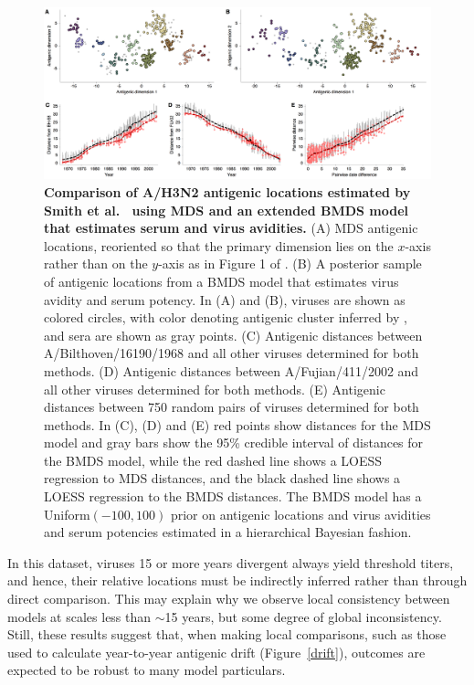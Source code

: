 \documentclass[11pt,oneside,letterpaper]{article}
\begin{document}
\begin{figure}[h]
	\centering		
	\includegraphics[width=1.0\textwidth]{figures/smith_comparison_effects}
	\caption{\textbf{Comparison of A/H3N2 antigenic locations estimated by Smith et al.\ \cite{Smith04} using MDS and an extended BMDS model that estimates serum and virus avidities.} 
	(A) MDS antigenic locations, reoriented so that the primary dimension lies on the $x$-axis rather than on the $y$-axis as in Figure 1 of \cite{Smith04}.
	(B) A posterior sample of antigenic locations from a BMDS model that estimates virus avidity and serum potency.
	In (A) and (B), viruses are shown as colored circles, with color denoting antigenic cluster inferred by \cite{Smith04}, and sera are shown as gray points.
	(C) Antigenic distances between A/Bilthoven/16190/1968 and all other viruses determined for both methods.
	(D) Antigenic distances between A/Fujian/411/2002 and all other viruses determined for both methods.
	(E) Antigenic distances between 750 random pairs of viruses determined for both methods.	
	In (C), (D) and (E) red points show distances for the MDS model and gray bars show the 95\% credible interval of distances for the BMDS model, while the red dashed line shows a LOESS regression to MDS distances, and the black dashed line shows a LOESS regression to the BMDS distances.
	The BMDS model has a Uniform$(-100,100)$ prior on antigenic locations and virus avidities and serum potencies estimated in a hierarchical Bayesian fashion. 	
	} 
	\label{smith_comparison_effects} 
\end{figure}

In this dataset, viruses 15 or more years divergent always yield threshold titers, and hence, their relative locations must be indirectly inferred rather than through direct comparison.
This may explain why we observe local consistency between models at scales less than $\sim$15 years, but some degree of global inconsistency.
Still, these results suggest that, when making local comparisons, such as those used to calculate year-to-year antigenic drift (Figure~\ref{drift}), outcomes are expected to be robust to  many model particulars.
\end{document}
